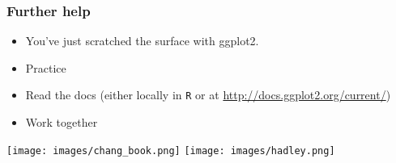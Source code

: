 \documentclass{beamer}\usepackage[]{graphicx}\usepackage[]{color}
\begin{document}

\begin{frame}[fragile]
\frametitle{Further help}
\begin{itemize}
\item You've just scratched the surface with ggplot2.
\item Practice
\item Read the docs (either locally in \texttt{R} or at \url{http://docs.ggplot2.org/current/})
\item Work together
\end{itemize}
\begin{center}
\texttt{[image: images/chang\_book.png]}
\texttt{[image: images/hadley.png]}
\end{center}
\end{frame}

\end{document}
